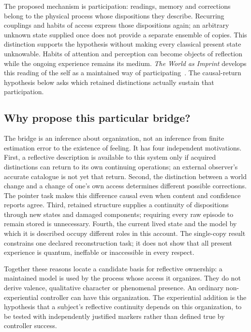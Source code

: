 \documentclass[12pt]{article}
\theoremstyle{definition}
\theoremstyle{remark}
\begin{document}
The proposed mechanism is participation: readings, memory and corrections
belong to the physical process whose dispositions they describe.
Recurring couplings and habits of access express those dispositions
again; an arbitrary unknown state supplied once does not provide a
separate ensemble of copies. This distinction supports the hypothesis
without making every classical present state unknowable. Habits of
attention and perception can become objects of reflection while the
ongoing experience remains its medium. \emph{The World as Imprint}
develops this reading of the self as a maintained way of
participating~\cite{WorldImprint}. The causal-return hypothesis below
asks which retained distinctions actually sustain that participation.

\subsection{Why propose this particular bridge?}

The bridge is an inference about organization, not an inference
from finite estimation error to the existence of feeling.
It has four independent motivations. First, a reflective
description is available to this system only if acquired
distinctions can return to its own continuing operations; an
external observer's accurate catalogue is not yet that return.
Second, the distinction between a world change and a change of
one's own access determines different possible corrections.
The pointer task makes this difference causal even when content
and confidence reports agree. Third, retained structure supplies
a continuity of dispositions through new states and damaged
components; requiring every raw episode to remain stored is
unnecessary. Fourth, the current lived state and the model by
which it is described occupy different roles in this account.
The single-copy result constrains one declared reconstruction
task; it does not show that all present experience is quantum,
ineffable or inaccessible in every respect.

Together these reasons locate a candidate basis for reflective
ownership: a maintained model is used by the process whose
access it organizes. They do not derive valence, qualitative
character or phenomenal presence. An ordinary non-experiential
controller can have this organization. The experiential addition
is the hypothesis that a subject's reflective continuity depends
on this organization, to be tested with independently justified
markers rather than defined true by controller success.
\end{document}
